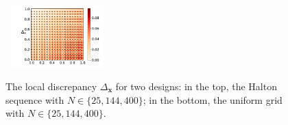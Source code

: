 \documentclass[twoside,11pt]{book}
\newtheorem{theorem}{Theorem}
\newtheorem{definition}{Definition}
\begin{document}
\begin{figure}
~\includegraphics[width= 0.32\textwidth]{img/discrepancy/local_discrepancy_uniform_grid_N_400.pdf}
\caption{The local discrepancy $\Delta_{\bm{x}}$ for two designs: in the top, the Halton sequence with $N \in \{25,144,400\}$; in the bottom, the uniform grid with $N \in \{25,144,400\}$. \label{fig:halton_vs_grid_disc}}
\end{figure}






\end{document}

